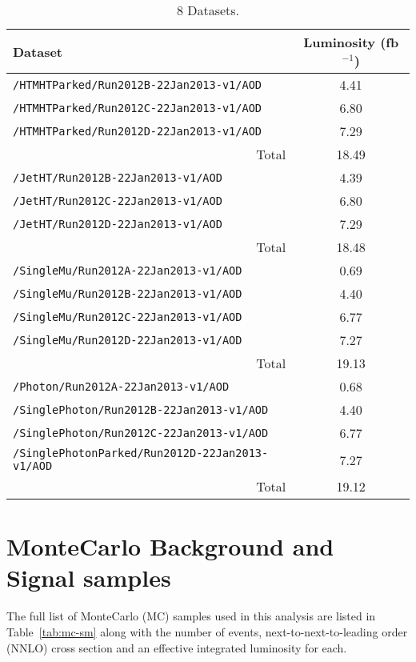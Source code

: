 \begin{table}[ht]
  \caption{8 \tev Datasets.}
  \label{tab:datasets}
  \centering
  \scriptsize
  \begin{tabular}{ lc }
    \hline
    \hline
    Dataset & Luminosity (fb$^{-1}$) \\
    \hline
    \verb!/HTMHTParked/Run2012B-22Jan2013-v1/AOD! & 4.41 \\
    \verb!/HTMHTParked/Run2012C-22Jan2013-v1/AOD! & 6.80 \\
    \verb!/HTMHTParked/Run2012D-22Jan2013-v1/AOD! & 7.29 \\
    \multicolumn{1}{r}{Total} & 18.49 \\ [0.5ex]
    \verb!/JetHT/Run2012B-22Jan2013-v1/AOD! & 4.39 \\
    \verb!/JetHT/Run2012C-22Jan2013-v1/AOD! & 6.80 \\
    \verb!/JetHT/Run2012D-22Jan2013-v1/AOD! & 7.29 \\
    \multicolumn{1}{r}{Total} & 18.48 \\ [0.5ex]
    \verb!/SingleMu/Run2012A-22Jan2013-v1/AOD! & 0.69 \\
    \verb!/SingleMu/Run2012B-22Jan2013-v1/AOD! & 4.40 \\
    \verb!/SingleMu/Run2012C-22Jan2013-v1/AOD! & 6.77 \\
    \verb!/SingleMu/Run2012D-22Jan2013-v1/AOD! & 7.27 \\
    \multicolumn{1}{r}{Total} & 19.13 \\ [0.5ex] %
    \verb!/Photon/Run2012A-22Jan2013-v1/AOD! & 0.68 \\
    \verb!/SinglePhoton/Run2012B-22Jan2013-v1/AOD! & 4.40 \\
    \verb!/SinglePhoton/Run2012C-22Jan2013-v1/AOD! & 6.77 \\
    \verb!/SinglePhotonParked/Run2012D-22Jan2013-v1/AOD! & 7.27 \\
    \multicolumn{1}{r}{Total} & 19.12 \\ [0.5ex] %
    \hline
    \hline
  \end{tabular}
\end{table}

\section{MonteCarlo Background and Signal samples}

The full list of MonteCarlo (MC) samples used in this analysis are listed in 
Table~\ref{tab:mc-sm} along with the number of events, next-to-next-to-leading 
order (NNLO) cross section and an effective integrated luminosity for each.

